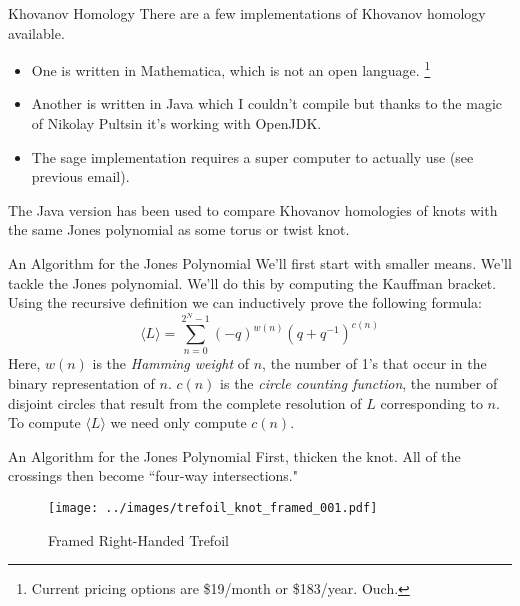 \documentclass{beamer}
\begin{document}
    \begin{frame}{Khovanov Homology}
        There are a few implementations of Khovanov homology available.
        \begin{itemize}
            \item One is written in Mathematica, which is not an open language.%
                  \footnote{Current pricing options are \$19/month
                            or \$183/year. Ouch.}
            \item Another is written in Java which I couldn't compile but thanks
                  to the magic of Nikolay Pultsin it's working with OpenJDK.
            \item The sage implementation requires a super computer to actually
                  use (see previous email).
        \end{itemize}
        The Java version has been used to compare Khovanov homologies of
        knots with the same Jones polynomial as some torus or twist knot.
    \end{frame}
    \begin{frame}{An Algorithm for the Jones Polynomial}
        We'll first start with smaller means. We'll tackle the Jones
        polynomial. We'll do this by computing the Kauffman bracket. Using the
        recursive definition we can inductively prove the following formula:
        \begin{equation}
            \label{eqn:kauffman_bracket}%
            \langle{L}\rangle=\sum_{n=0}^{2^{N}-1}
                (-q)^{w(n)}(q+q^{-1})^{c(n)}
        \end{equation}
        Here, $w(n)$ is the \textit{Hamming weight} of $n$, the number of 1's
        that occur in the binary representation of $n$. $c(n)$ is the
        \textit{circle counting function}, the number of disjoint circles that
        result from the complete resolution of $L$ corresponding to $n$.
        To compute $\langle{L}\rangle$ we need only compute $c(n)$.
    \end{frame}
    \begin{frame}{An Algorithm for the Jones Polynomial}
        First, thicken the knot. All of the crossings then become
        ``four-way intersections."
        \begin{figure}
            \centering
            \texttt{[image: ../images/trefoil\_knot\_framed\_001.pdf]}
            \caption{Framed Right-Handed Trefoil}
            \label{fig:trefoil_knot_framed_001}
        \end{figure}
    \end{frame}
\end{document}
